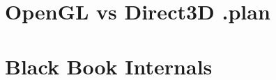 \documentclass{book}
\newcommand\blankpage{%
    \null
    \thispagestyle{empty}%
    \addtocounter{page}{-1}%
    \newpage}
\begin{document}
      \chapter{OpenGL vs Direct3D .plan}
      
        \chapter{Black Book Internals}
    

    \ifx\forprint\undefined   

\else 
    \blankpage
    \blankpage
\fi   
\end{document}
